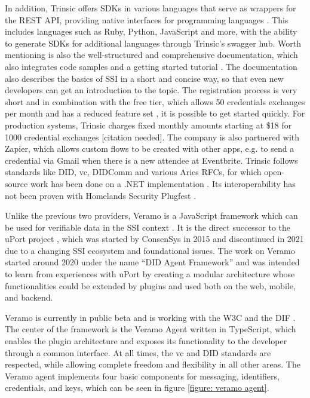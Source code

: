     In addition, Trinsic offers SDKs in various languages that serve as wrappers for the REST API, providing native interfaces for programming languages \cite{trinsic_service_2021}. This includes languages such as Ruby, Python, JavaScript and more, with the ability to generate SDKs for additional languages through Trinsic's swagger hub. Worth mentioning is also the well-structured and comprehensive documentation, which also integrates code samples and a getting started tutorial \cite{trinsic_introduction_2021}. The documentation also describes the basics of SSI in a short and concise way, so that even new developers can get an introduction to the topic. The registration process is very short and in combination with the free tier, which allows 50 credentials exchanges per month and has a reduced feature set \cite{trinsic_pricing_2021}, it is possible to get started quickly. For production systems, Trinsic charges fixed monthly amounts starting at \$18 for 1000 credential exchanges [citation needed]. The company is also partnered with Zapier, which allows custom flows to be created with other apps, e.g. to send a credential via Gmail when there is a new attendee at Eventbrite. Trinsic follows standards like \ac{DID}, \ac{vc}, DIDComm and various Aries RFCs, for which open-source work has been done on a .NET implementation \cite{trinsic_open_2021}. Its interoperability has not been proven with Homelands Security Plugfest \cite{homeland_security_interoperability_2021}.
    
    Unlike the previous two providers, Veramo is a JavaScript framework which can be used for verifiable data in the SSI context \cite{veramo_veramo_2021-1}. It is the direct successor to the uPort project \cite{uport_uport_2021}, which was started by ConsenSys in 2015 and discontinued in 2021 due to a changing SSI ecosystem and foundational issues. The work on Veramo started around 2020 under the name “DID Agent Framework” and was intended to learn from experiences with uPort by creating a modular architecture whose functionalities could be extended by plugins and used both on the web, mobile, and backend. \cite{uport_veramo_2021}
    
    Veramo is currently in public beta and is working with the W3C and the DIF \cite{veramo_veramo_2021-1}. The center of the framework is the Veramo Agent written in TypeScript, which enables the plugin architecture and exposes its functionality to the developer through a common interface. At all times, the \ac{vc} and \ac{DID} standards are respected, while allowing complete freedom and flexibility in all other areas. The Veramo agent implements four basic components for messaging, identifiers, credentials, and keys, which can be seen in figure \ref{figure: veramo agent}. \cite{veramo_veramo_2021-2}
    
